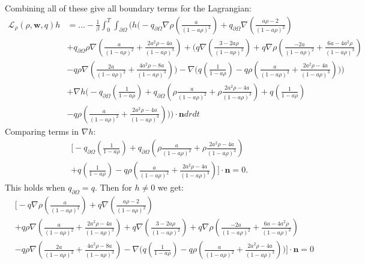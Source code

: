 \documentclass[11pt, a4paper]{article}
\theoremstyle{definition}
\newcommand{\w}{\mathbf{w}}
\newcommand{\n}{\mathbf{n}}
\begin{document}
Combining all of these give all boundary terms for the Lagrangian:
\begin{align*}
	\mathcal{L}_\rho (\rho,\w,q)h &=... - \frac{1}{\beta}\int_0^T \int_{\partial \Omega} \bigg( h \bigg(-  q_{\partial \Omega}\nabla \rho \left( \frac{a}{(1 -a \rho)^2} \right)+ q_{\partial \Omega} \nabla \left(\frac{a \rho  - 2}{(1- a \rho)^2}\right) \\
	&+  q_{\partial \Omega}\rho \nabla \left( \frac{a}{(1- a \rho)^2} + \frac{2a^2\rho - 4a}{(1- a \rho)^3} \right)
	+ \bigg( q  \nabla \left( \frac{3-2a\rho}{(1-a\rho)^2} \right) + q \nabla \rho  \left( \frac{-2a }{(1-a\rho)^2} + \frac{6a-4a^2  \rho}{(1-a\rho)^3}  \right)\\
	&- q\rho \nabla \left(\frac{2a }{(1-a\rho)^2} + \frac{4a^2\rho -8a}{(1-a\rho)^3} \right) \bigg) -  \nabla \bigg(q \left(\frac{1}{1- a\rho} \right)  - q\rho  \left(\frac{a }{(1-a\rho)^2} + \frac{2a^2\rho -4a}{(1-a\rho)^3} \right)  \bigg)	\bigg)\\
	& +\nabla h \bigg(- q_{\partial \Omega} \left(\frac{1}{1 - a\rho}\right) + q_{\partial \Omega}\left( \rho \frac{a}{(1- a \rho)^2} + \rho\frac{2a^2\rho - 4a}{(1- a \rho)^3} \right) +q \left(\frac{1}{1- a\rho} \right) \\
	& - q\rho  \left(\frac{a }{(1-a\rho)^2} + \frac{2a^2\rho -4a}{(1-a\rho)^3} \right)  \bigg) \bigg) \cdot \n dr dt
\end{align*}
Comparing terms in $\nabla h$:
\begin{align*}
	&\bigg[-q_{\partial \Omega} \left(\frac{1}{1 - a\rho}\right) + q_{\partial \Omega}\left( \rho \frac{a}{(1- a \rho)^2} + \rho\frac{2a^2\rho - 4a}{(1- a \rho)^3} \right) \\
	&+q \left(\frac{1}{1- a\rho} \right)  - q\rho  \left(\frac{a }{(1-a\rho)^2} + \frac{2a^2\rho -4a}{(1-a\rho)^3} \right) \bigg] \cdot \n = 0.
\end{align*}
This holds when $q_{\partial \Omega} = q$.
Then for $h \neq 0$ we get:
\begin{align*}
	&\bigg[-q\nabla \rho \left( \frac{a}{(1 -a \rho)^2} \right)+q \nabla \left(\frac{a \rho  - 2}{(1- a \rho)^2}\right) \\
	&+q\rho \nabla \left( \frac{a}{(1- a \rho)^2} + \frac{2a^2\rho - 4a}{(1- a \rho)^3} \right)
	+  q  \nabla \left( \frac{3-2a\rho}{(1-a\rho)^2} \right) + q \nabla \rho  \left( \frac{-2a }{(1-a\rho)^2} + \frac{6a-4a^2  \rho}{(1-a\rho)^3}  \right)\\
	&- q\rho \nabla \left(\frac{2a }{(1-a\rho)^2} + \frac{4a^2\rho -8a}{(1-a\rho)^3} \right) -  \nabla \bigg(q \left(\frac{1}{1- a\rho} \right)  - q\rho  \left(\frac{a }{(1-a\rho)^2} + \frac{2a^2\rho -4a}{(1-a\rho)^3} \right) \bigg)\bigg] \cdot \n = 0
\end{align*}
\end{document}

